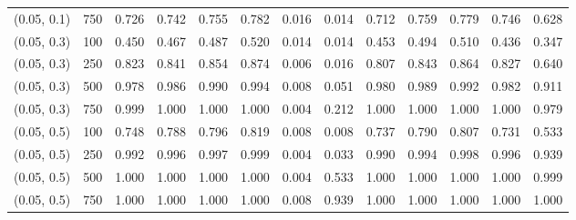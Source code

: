 \begin{table}[ht]
{\begin{tabular}{ll|ccccccccccc}
  			(0.05, 0.1) & 750 & 0.726 & 0.742 & 0.755 & 0.782 & 0.016 & 0.014 & 0.712 & 0.759 & 0.779 & 0.746 & 0.628 \\
  			(0.05, 0.3) & 100 & 0.450 & 0.467 & 0.487 & 0.520 & 0.014 & 0.014 & 0.453 & 0.494 & 0.510 & 0.436 & 0.347 \\
  			(0.05, 0.3) & 250 & 0.823 & 0.841 & 0.854 & 0.874 & 0.006 & 0.016 & 0.807 & 0.843 & 0.864 & 0.827 & 0.640 \\
  			(0.05, 0.3) & 500 & 0.978 & 0.986 & 0.990 & 0.994 & 0.008 & 0.051 & 0.980 & 0.989 & 0.992 & 0.982 & 0.911 \\
  			(0.05, 0.3) & 750 & 0.999 & 1.000 & 1.000 & 1.000 & 0.004 & 0.212 & 1.000 & 1.000 & 1.000 & 1.000 & 0.979 \\
  			(0.05, 0.5) & 100 & 0.748 & 0.788 & 0.796 & 0.819 & 0.008 & 0.008 & 0.737 & 0.790 & 0.807 & 0.731 & 0.533 \\
  			(0.05, 0.5) & 250 & 0.992 & 0.996 & 0.997 & 0.999 & 0.004 & 0.033 & 0.990 & 0.994 & 0.998 & 0.996 & 0.939 \\
  			(0.05, 0.5) & 500 & 1.000 & 1.000 & 1.000 & 1.000 & 0.004 & 0.533 & 1.000 & 1.000 & 1.000 & 1.000 & 0.999 \\
  			(0.05, 0.5) & 750 & 1.000 & 1.000 & 1.000 & 1.000 & 0.008 & 0.939 & 1.000 & 1.000 & 1.000 & 1.000 & 1.000 \\
  			\hline
  		\end{tabular}
  		
  	}
  \end{table}
  
  
  
  
  